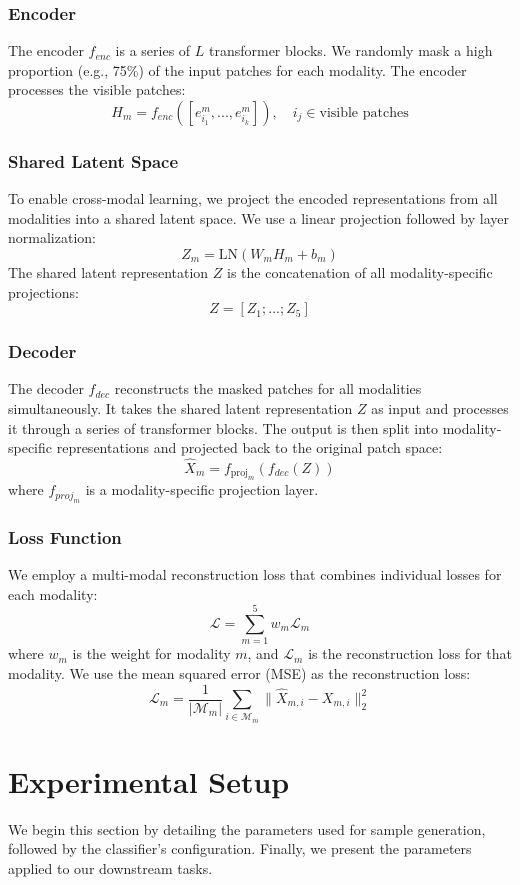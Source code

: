 \subsubsection{Encoder}

The encoder $f_{enc}$ is a series of $L$ transformer blocks. We randomly mask a high proportion (e.g., 75\%) of the input patches for each modality. The encoder processes the visible patches:
$$H_m = f_{enc}([e^m_{i_1}, ..., e^m_{i_k}]), \quad i_j \in \text{visible patches}$$

\subsubsection{Shared Latent Space}

To enable cross-modal learning, we project the encoded representations from all modalities into a shared latent space. We use a linear projection followed by layer normalization:
$$Z_m = \text{LN}(W_m H_m + b_m)$$
The shared latent representation $Z$ is the concatenation of all modality-specific projections:
$$Z = [Z_1; ...; Z_5]$$

\subsubsection{Decoder}

The decoder $f_{dec}$ reconstructs the masked patches for all modalities simultaneously. It takes the shared latent representation $Z$ as input and processes it through a series of transformer blocks. The output is then split into modality-specific representations and projected back to the original patch space:
$$\hat{X}_m = f_{\mathrm{proj}_m}(f_{dec}(Z))$$
where $f_{proj_m}$ is a modality-specific projection layer.

\subsubsection{Loss Function}

We employ a multi-modal reconstruction loss that combines individual losses for each modality:
$$\mathcal{L} = \sum_{m=1}^5 w_m \mathcal{L}_m$$
where $w_m$ is the weight for modality $m$, and $\mathcal{L}_m$ is the reconstruction loss for that modality. We use the mean squared error (MSE) as the reconstruction loss:
$$\mathcal{L}_m = \frac{1}{|\mathcal{M}_m|} \sum_{i \in \mathcal{M}_m} \| \hat{X}_{m,i} - X_{m,i} \|_2^2$$


\section{Experimental Setup}
We begin this section by detailing the parameters used for sample generation, followed by the classifier's configuration. Finally, we present the parameters applied to our downstream tasks.

